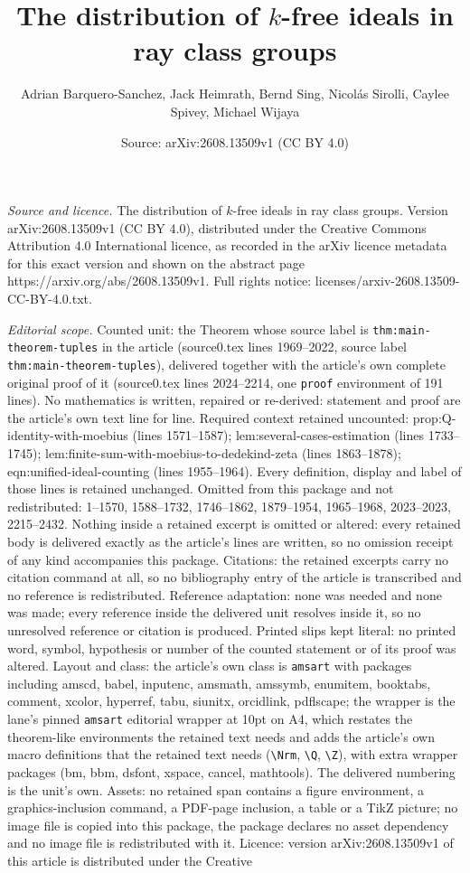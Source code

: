 \documentclass[10pt,a4paper]{amsart}
\title[The distribution of $k$-free ideals in ray class groups]{The distribution of $k$-free ideals in ray class groups}
\author{Adrian Barquero-Sanchez, Jack Heimrath, Bernd Sing, Nicol\'as Sirolli, Caylee Spivey, Michael Wijaya}
\date{Source: arXiv:2608.13509v1 (CC BY 4.0)}
\begin{document}
\maketitle

\noindent\emph{Source and licence.} The distribution of $k$-free ideals in ray class groups. Version arXiv:2608.13509v1 (CC BY 4.0), distributed under the Creative Commons Attribution 4.0 International licence, as recorded in the arXiv licence metadata for this exact version and shown on the abstract page https://arxiv.org/abs/2608.13509v1. Full rights notice: licenses/arxiv-2608.13509-CC-BY-4.0.txt.\par\smallskip

\noindent\textit{Editorial scope.} Counted unit: the Theorem whose source label is \texttt{thm:main-theorem-tuples} in the article (source0.tex lines 1969--2022, source label \texttt{thm:main-theorem-tuples}), delivered together with the article's own complete original proof of it (source0.tex lines 2024--2214, one \texttt{proof} environment of 191 lines). No mathematics is written, repaired or re-derived: statement and proof are the article's own text line for line. Required context retained uncounted: prop:Q-identity-with-moebius (lines 1571--1587); lem:several-cases-estimation (lines 1733--1745); lem:finite-sum-with-moebius-to-dedekind-zeta (lines 1863--1878); eqn:unified-ideal-counting (lines 1955--1964). Every definition, display and label of those lines is retained unchanged. Omitted from this package and not redistributed: 1--1570, 1588--1732, 1746--1862, 1879--1954, 1965--1968, 2023--2023, 2215--2432. Nothing inside a retained excerpt is omitted or altered: every retained body is delivered exactly as the article's lines are written, so no omission receipt of any kind accompanies this package. Citations: the retained excerpts carry no citation command at all, so no bibliography entry of the article is transcribed and no reference is redistributed. Reference adaptation: none was needed and none was made; every reference inside the delivered unit resolves inside it, so no unresolved reference or citation is produced. Printed slips kept literal: no printed word, symbol, hypothesis or number of the counted statement or of its proof was altered. Layout and class: the article's own class is \texttt{amsart} with packages including amscd, babel, inputenc, amsmath, amssymb, enumitem, booktabs, comment, xcolor, hyperref, tabu, siunitx, orcidlink, pdflscape; the wrapper is the lane's pinned \texttt{amsart} editorial wrapper at 10pt on A4, which restates the theorem-like environments the retained text needs and adds the article's own macro definitions that the retained text needs (\texttt{\textbackslash Nrm}, \texttt{\textbackslash Q}, \texttt{\textbackslash Z}), with extra wrapper packages (bm, bbm, dsfont, xspace, cancel, mathtools). The delivered numbering is the unit's own. Assets: no retained span contains a figure environment, a graphics-inclusion command, a PDF-page inclusion, a table or a TikZ picture; no image file is copied into this package, the package declares no asset dependency and no image file is redistributed with it. Licence: version arXiv:2608.13509v1 of this article is distributed under the Creative 
\end{document}

